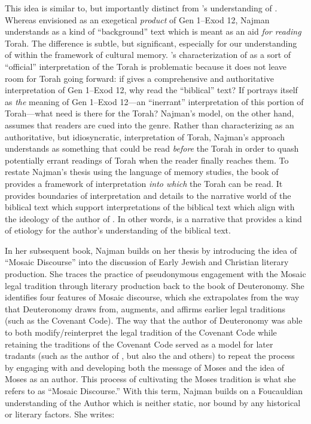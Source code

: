 This idea is similar to, but importantly distinct from \vanderkam's understanding of \jub. Whereas \vanderkam envisioned \jub as an exegetical \emph{product} of Gen 1--Exod 12, Najman understands \jub as a kind of ``background'' text which is meant as an aid \emph{for reading} Torah. The difference is subtle, but significant, especially for our understanding of \jub within the framework of cultural memory. \vanderkam's characterization of \jub as a sort of ``official'' interpretation of the Torah is problematic because it does not leave room for Torah going forward: if \jub gives a comprehensive and authoritative interpretation of Gen 1--Exod 12, why read the ``biblical'' text? If \jub portrays itself as \emph{the} meaning of Gen 1--Exod 12---an ``inerrant'' interpretation of this portion of Torah---what need is there for the Torah? Najman's model, on the other hand, assumes that readers are cued into the genre. Rather than  characterizing \jub as an authoritative, but idiosyncratic, interpretation of Torah, Najman's approach understands \jub as something that could be read \emph{before} the Torah in order to quash potentially errant readings of Torah when the reader finally reaches them.%
    \autocite[408]{najman_jsj1999} 
To restate Najman's thesis using the language of memory studies, the book of \jub provides a framework of interpretation \emph{into which} the Torah can be read. It provides boundaries of interpretation and details to the narrative world of the biblical text which support interpretations of the biblical text which align with the ideology of the author of \jub. In other words, \jub is a narrative that provides a kind of etiology for the author's understanding of the biblical text. 

In her subsequent book, Najman builds on her thesis by introducing the idea of ``Mosaic Discourse'' into the discussion of Early Jewish and Christian literary production. She traces the practice of pseudonymous engagement with the Mosaic legal tradition through literary production back to the book of Deuteronomy.\autocite[48]{najman2003} She identifies four features of Mosaic discourse, which she extrapolates from the way that Deuteronomy draws from, augments, and affirms earlier legal traditions (such as the Covenant Code). The way that the author of Deuteronomy was able to both modify/reinterpret the legal tradition of the Covenant Code while retaining the traditions of the Covenant Code served as a model for later tradants (such as the author of \jub, but also the \templescroll and others) to repeat the process by engaging with and developing both the message of Moses and the idea of Moses as an author. This process of cultivating the Moses tradition is what she refers to as ``Mosaic Discourse.'' With this term, Najman builds on a Foucauldian understanding of the Author which is neither static, nor bound by any historical or literary factors. She writes:

